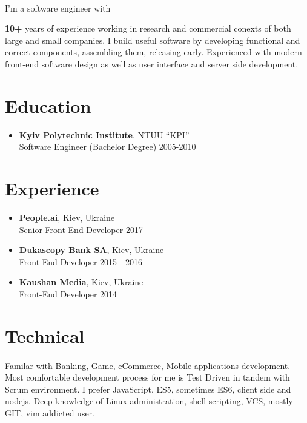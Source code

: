 \documentclass[a4paper,11pt]{article}
\begin{document}
\paragraph{} I'm a software engineer with {\textbf {\small{10+}} years of experience working in research and commercial
conexts of both large and small companies. I build useful software by developing functional and correct
components, assembling them, releasing early. Experienced with modern front-end software design as well as
user interface and server side development.

%
%

\section*{Education}
\begin{itemize}[itemsep=-4pt,label=]
  \item \textbf{Kyiv Polytechnic Institute}, NTUU ``KPI'' \\
  Software Engineer (Bachelor Degree) \hfill 2005-2010
\end{itemize}

%
%

\section*{Experience}
\begin{itemize}[itemsep=4pt,label=]

  \item \textbf{People.ai}, Kiev, Ukraine\\
    Senior Front-End Developer \hfill  2017

  \item \textbf{Dukascopy Bank SA}, Kiev, Ukraine\\
    Front-End Developer \hfill  2015 - 2016

  \item \textbf{Kaushan Media}, Kiev, Ukraine \\
    Front-End Developer \hfill  2014

\end{itemize}

%
%

\section*{Technical}
\paragraph{} Familar with Banking, Game, eCommerce, Mobile applications development. Most comfortable development process for me is Test Driven in tandem with Scrum environment. I prefer JavaScript, ES5,
sometimes ES6, client side and nodejs. Deep knowledge of Linux administration, shell scripting, VCS, mostly GIT, vim addicted user.

}
\end{document}
